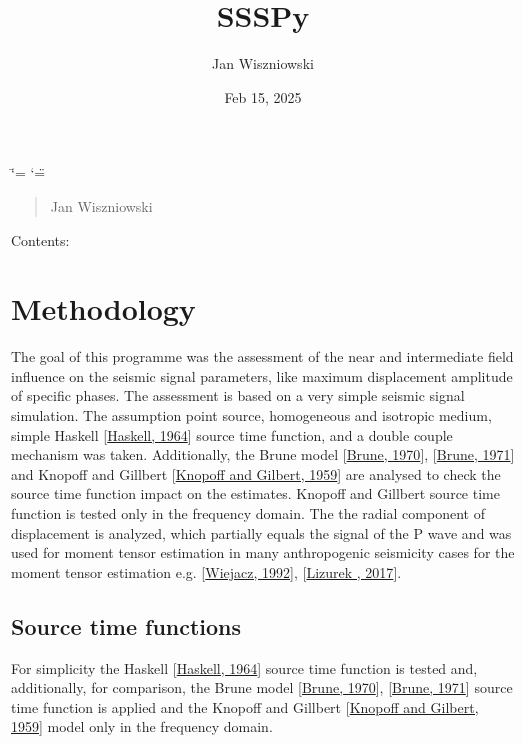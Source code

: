 \documentclass[letterpaper,10pt,english]{sphinxmanual}
\title{SSSPy}
\date{Feb 15, 2025}
\author{Jan Wiszniowski}
\begin{document}
\ifdefined\shorthandoff
  \ifnum\catcode`\=\string=\active\shorthandoff{=}\fi
  \ifnum\catcode`\"=\active{}\fi
\fi

\pagestyle{empty}
\sphinxmaketitle
\pagestyle{plain}
\sphinxtableofcontents
\pagestyle{normal}
\label{\detokenize{index::doc}}


\sphinxAtStartPar
{}
\begin{quote}\begin{description}
 Jan Wiszniowski 

\end{description}\end{quote}

\sphinxAtStartPar
Contents:

\sphinxstepscope


\chapter{Methodology}
\label{\detokenize{description:methodology}}\label{\detokenize{description:methodology-head}}\label{\detokenize{description::doc}}
\sphinxAtStartPar
The goal of this programme was the assessment of the near and intermediate field influence on the seismic signal parameters,
like maximum displacement amplitude of specific phases.
The assessment is based on a very simple seismic signal simulation.
The assumption point source, homogeneous and isotropic medium, simple Haskell {[}\hyperlink{cite.bibliography:id13}{Haskell, 1964}{]} source time function,
and a double couple mechanism was taken.
Additionally, the Brune model {[}\hyperlink{cite.bibliography:id4}{Brune, 1970}{]}, {[}\hyperlink{cite.bibliography:id5}{Brune, 1971}{]}
and Knopoff and Gillbert {[}\hyperlink{cite.bibliography:id14}{Knopoff and Gilbert, 1959}{]}
are analysed to check the source time function impact on the estimates.
Knopoff and Gillbert source time function is tested only in the frequency domain.
The the radial component of displacement is analyzed, which partially equals the signal of the P wave
and was used for moment tensor estimation in many anthropogenic seismicity cases for the moment tensor estimation
e.g. {[}\hyperlink{cite.bibliography:id10}{Wiejacz, 1992}{]}, {[}\hyperlink{cite.bibliography:id9}{Lizurek , 2017}{]}.


\section{Source time functions}
\label{\detokenize{description:source-time-functions}}
\sphinxAtStartPar
For simplicity the Haskell {[}\hyperlink{cite.bibliography:id13}{Haskell, 1964}{]} source time function is tested
and, additionally, for comparison, the Brune model {[}\hyperlink{cite.bibliography:id4}{Brune, 1970}{]}, {[}\hyperlink{cite.bibliography:id5}{Brune, 1971}{]}
source time function is applied and the Knopoff and Gillbert {[}\hyperlink{cite.bibliography:id14}{Knopoff and Gilbert, 1959}{]}
model only in the frequency domain.
\end{document}
